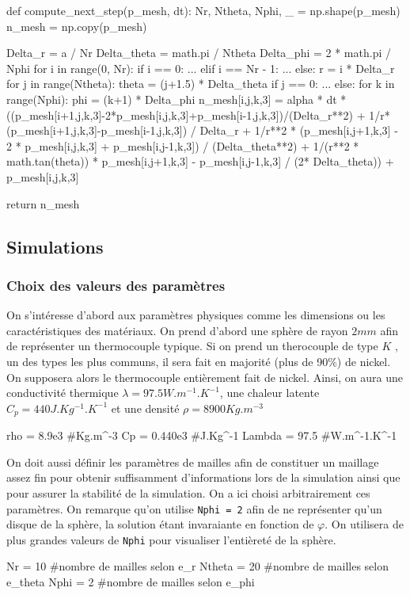 \documentclass[fleqn]{article}
\renewcommand{\phi}{\varphi}
\begin{document}
\begin{python}
def compute_next_step(p_mesh, dt):
    Nr, Ntheta, Nphi, _ = np.shape(p_mesh)
    n_mesh = np.copy(p_mesh)

    Delta_r = a / Nr
    Delta_theta = math.pi / Ntheta
    Delta_phi = 2 * math.pi / Nphi
    for i in range(0, Nr):
        if i == 0:
            ...
        elif i == Nr - 1:
            ...     
        else:
            r = i * Delta_r
            for j in range(Ntheta):
                theta = (j+1.5) * Delta_theta
                if j == 0:
                    ...              
                else:
                    for k in range(Nphi):
                        phi = (k+1) * Delta_phi
                        n_mesh[i,j,k,3] = alpha * dt * 
                    ((p_mesh[i+1,j,k,3]-2*p_mesh[i,j,k,3]+p_mesh[i-1,j,k,3])/(Delta_r**2)
                    + 1/r*(p_mesh[i+1,j,k,3]-p_mesh[i-1,j,k,3]) / Delta_r
+ 1/r**2 * (p_mesh[i,j+1,k,3] - 2 * p_mesh[i,j,k,3] + p_mesh[i,j-1,k,3]) / (Delta_theta**2)
+ 1/(r**2 * math.tan(theta)) * p_mesh[i,j+1,k,3] - p_mesh[i,j-1,k,3] / (2* Delta_theta)) 
+ p_mesh[i,j,k,3]
                        
    return n_mesh
\end{python}

\subsection{Simulations}
\subsubsection{Choix des valeurs des paramètres}

On s'intéresse d'abord aux paramètres physiques comme les dimensions ou les caractéristiques des matériaux. On prend d'abord une sphère de rayon $2mm$ afin de représenter un thermocouple typique. 
Si on prend un therocouple de type $K$ , un des types les plus communs, il sera fait en majorité (plus de 90\%) de nickel. On supposera alors le thermocouple entièrement fait de nickel. Ainsi, on aura une conductivité thermique $\lambda = 97.5W.m^{-1}.K^{-1}$, une chaleur latente $C_p = 440 J.Kg^{-1}.K^{-1}$ et une densité $\rho = 8900 Kg.m^{-3}$ 
\begin{python}
    rho = 8.9e3   #Kg.m^-3
    Cp = 0.440e3  #J.Kg^-1
    Lambda = 97.5 #W.m^-1.K^-1
\end{python}

On doit aussi définir les paramètres de mailles afin de constituer un maillage assez fin pour obtenir suffisamment d'informations lors de la simulation ainsi que pour assurer la stabilité de la simulation.
On a ici choisi arbitrairement ces paramètres. On remarque qu'on utilise \texttt{Nphi = 2} afin de ne représenter qu'un disque de la sphère, la solution étant invaraiante en fonction de $\phi$. On utilisera de plus grandes valeurs de  \texttt{Nphi} pour visualiser l'entièreté de la sphère.
\begin{python}
    Nr =  10     #nombre de mailles selon e_r
    Ntheta = 20  #nombre de mailles selon e_theta
    Nphi = 2     #nombre de mailles selon e_phi
\end{python}
\end{document}
